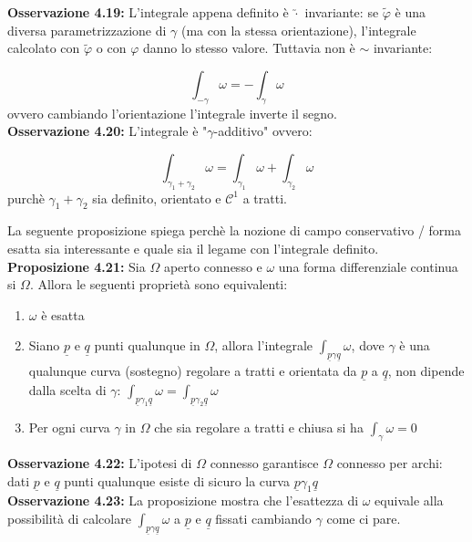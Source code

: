 \documentclass[a4paper,11pt,titlepage]{book}
\begin{document}
\textbf{Osservazione 4.19: }L'integrale appena definito è $\utilde\cdot$ invariante: se $\tilde{\varphi}$ è una diversa parametrizzazione di $\gamma$ (ma con la stessa orientazione), l'integrale calcolato con $\tilde{\varphi}$ o con $\varphi$ danno lo stesso valore. Tuttavia non è $\sim$ invariante:

$$\int_{-\gamma}\omega=-\int_\gamma\omega$$
ovvero cambiando l'orientazione l'integrale inverte il segno.\\

\textbf{Osservazione 4.20: }L'integrale è "$\gamma$-additivo" ovvero:

$$\int_{\gamma_1+\gamma_2}\omega=\int_{\gamma_1}\omega+\int_{\gamma_2}\omega$$
purchè $\gamma_1+\gamma_2$ sia definito, orientato e $\mathcal{C}^1$ a tratti.

La seguente proposizione spiega perchè la nozione di campo conservativo / forma esatta sia interessante e quale sia il legame con l'integrale definito.\\

\textbf{Proposizione 4.21: }Sia $\Omega$ aperto connesso e $\omega$ una forma differenziale continua si $\Omega$. Allora le seguenti proprietà sono equivalenti:\begin{enumerate}
\item $\omega$ è esatta
\item Siano $\underline{p}$ e $\underline{q}$ punti qualunque in $\Omega$, allora l'integrale $\int_{\underline{p}\gamma\underline{q}}\omega$, dove $\gamma$ è una qualunque curva (sostegno) regolare a tratti e orientata da $\underline{p}$ a $\underline{q}$, non dipende dalla scelta di $\gamma$: $\int_{\underline{p}\gamma_1\underline{q}}\omega=\int_{\underline{p}\gamma_2\underline{q}}\omega$
\item Per ogni curva $\gamma$ in $\Omega$ che sia regolare a tratti e chiusa si ha $\int_\gamma\omega=0$
\end{enumerate}

\textbf{Osservazione 4.22: }L'ipotesi di $\Omega$ connesso garantisce $\Omega$ connesso per archi: dati $\underline{p}$ e $\underline{q}$ punti qualunque esiste di sicuro la curva $\underline{p}\gamma_1\underline{q}$\\

\textbf{Osservazione 4.23:} La proposizione mostra che l'esattezza di $\omega$ equivale alla possibilità di calcolare $\int_{\underline{p}\gamma\underline{q}}\omega$ a $\underline{p}$ e $\underline{q}$ fissati cambiando $\gamma$ come ci pare.\\
\end{document}
